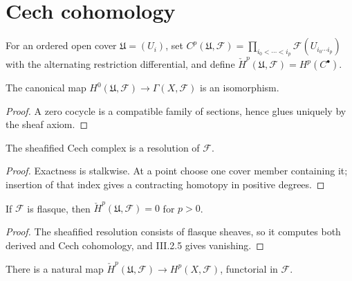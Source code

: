 \section{Cech cohomology}
\label{ha-ch3-sec4}
\begin{definition}
\label{ha-ch3-def-cech}
For an ordered open cover $\mathfrak U=(U_i)$, set
$C^p(\mathfrak U,\mathcal F)=\prod_{i_0<\cdots<i_p}\mathcal F(U_{i_0\cdots i_p})$
with the alternating restriction differential, and define
$\check H^p(\mathfrak U,\mathcal F)=H^p(C^\bullet)$.
\end{definition}
\begin{lemma}
\label{ha-ch3-lem-cech-zero}
The canonical map $H^0(\mathfrak U,\mathcal F)\to\Gamma(X,\mathcal F)$ is an
isomorphism.
\end{lemma}
\begin{proof}
A zero cocycle is a compatible family of sections, hence
glues uniquely by the sheaf axiom.
\end{proof}
\begin{lemma}
\label{ha-ch3-lem-cech-resolution}
The sheafified Cech complex is a resolution of $\mathcal F$.

\end{lemma}
\begin{proof}

Exactness is stalkwise.  At a point choose one cover member containing it;
insertion of that index gives a contracting homotopy in positive degrees.

\end{proof}
\begin{proposition}
\label{ha-ch3-prop-cech-flasque}
If $\mathcal F$ is flasque, then $\check H^p(\mathfrak U,\mathcal F)=0$ for
$p>0$.
\end{proposition}
\begin{proof}
The sheafified resolution consists of flasque sheaves, so it
computes both derived and Cech cohomology, and III.2.5 gives vanishing.
\end{proof}
\begin{lemma}
\label{ha-ch3-lem-cech-comparison-map}
There is a natural map $\check H^p(\mathfrak U,\mathcal F)\to H^p(X,\mathcal F)$,
functorial in $\mathcal F$.

\end{lemma}

